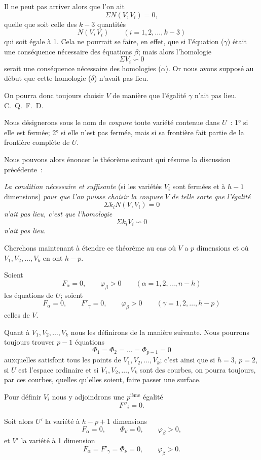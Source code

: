 \documentclass{article}
\begin{document}
Il ne peut pas arriver alors que l'on ait
\[
\Sigma N(V, V_{i}) = 0, \tag{$\gamma$}
\]
quelle que soit celle des $k-3$ quantités
\[
N(V, V_{i}) \qquad (i = 1, 2, \ldots, k-3)
\]
qui soit égale à 1. Cela ne pourrait se faire, en effet, que si l'équation ($\gamma$) était une conséquence nécessaire des équations $\beta$; mais alors l'homologie
\[
\Sigma V_{i} \backsim 0 \tag{$\delta$}
\]
serait une conséquence nécessaire des homologies ($\alpha$). Or nous avons supposé au début que cette homologie ($\delta$) n'avait pas lieu.

On pourra donc toujours choisir $V$ de manière que l'égalité $\gamma$ n'ait pas lieu. C.~Q.~F.~D.

Nous désignerons sous le nom de \emph{coupure} toute variété contenue dans $U$~: 1° si elle est fermée; 2° si elle n'est pas fermée, mais si sa frontière fait partie de la frontière complète de $U$.

Nous pouvons alors énoncer le théorème suivant qui résume la discussion précédente~:

\emph{La condition nécessaire et suffisante} (si les variétés $V_{i}$ sont fermées et à $h-1$ dimensions) \emph{pour que l'on puisse choisir la coupure} $V$ \emph{de telle sorte que l'égalité}
\[
\Sigma k_{i}N(V, V_{i}) = 0
\]
\emph{n'ait pas lieu, c'est que l'homologie}
\[
\Sigma k_{i}V_{i} \backsim 0
\]
\emph{n'ait pas lieu}.

Cherchons maintenant à étendre ce théorème au cas où $V$ a $p$ dimensions et où $V_{1}, V_{2}, \ldots, V_{k}$ en ont $h-p$.

Soient
\[
F_{\alpha} = 0, \qquad \varphi_{\beta} > 0 \qquad (\alpha = 1, 2, \ldots, n-h)
\]
les équations de $U$; soient
\[
F_{\alpha} = 0, \qquad F'_{\gamma} = 0, \qquad \varphi_{\beta} > 0 \qquad (\gamma = 1, 2, \ldots, h-p)
\]
celles de $V$.

Quant à $V_{1}, V_{2}, \ldots, V_{k}$ nous les définirons de la manière suivante. Nous pourrons toujours trouver $p-1$ équations
\[
\Phi_{1} = \Phi_{2} = \ldots = \Phi_{p-1} = 0
\]
auxquelles satisfont tous les points de $V_{1}, V_{2}, \ldots, V_{k}$; c'est ainsi que si $h = 3$, $p = 2$, si $U$ est l'espace ordinaire et si $V_{1}, V_{2}, \ldots, V_{k}$ sont des courbes, on pourra toujours, par ces courbes, quelles qu'elles soient, faire passer une surface.

Pour définir $V_{i}$ nous y adjoindrons une $p^{\text{ième}}$ égalité
\[
F''_{i} = 0.
\]

Soit alors $U'$ la variété à $h-p+1$ dimensions
\[
F_{\alpha} = 0, \qquad \Phi_{\nu} = 0, \qquad \varphi_{\beta} > 0,
\]
et $V'$ la variété à 1 dimension
\[
F_{\alpha} = F'_{\gamma} = \Phi_{\nu} = 0, \qquad \varphi_{\beta} > 0.
\]
\end{document}
